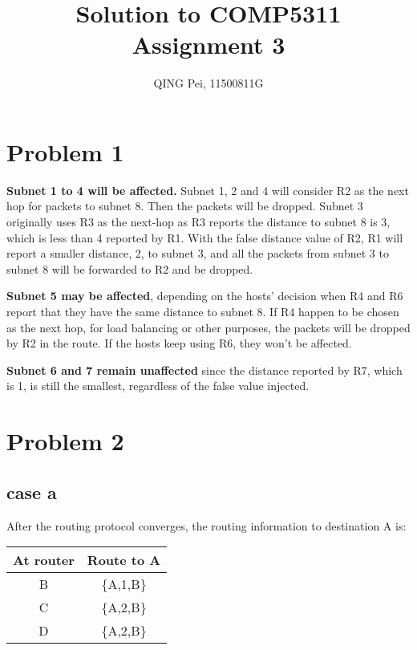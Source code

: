 \documentclass[a4paper]{article}
\title{Solution to COMP5311 Assignment 3}
\author{QING Pei, 11500811G}
\begin{document}
\maketitle

\section{Problem 1} %
\label{sec:problem_1}
\textbf{Subnet 1 to 4 will be affected.} Subnet 1, 2 and 4 will consider R2 as the next hop for packets to subnet 8. Then the packets will be dropped. Subnet 3 originally uses R3 as the next-hop as R3 reports the distance to subnet 8 is 3, which is less than 4 reported by R1. With the false distance value of R2, R1 will report a smaller distance, 2, to subnet 3, and all the packets from subnet 3 to subnet 8 will be forwarded to R2 and be dropped.

\textbf{Subnet 5 may be affected}, depending on the hosts' decision when R4 and R6 report that they have the same distance to subnet 8. If R4 happen to be chosen as the next hop, for load balancing or other purposes, the packets will be dropped by R2 in the route. If the hosts keep using R6, they won't be affected.

\textbf{Subnet 6 and 7 remain unaffected} since the distance reported by R7, which is 1, is still the smallest, regardless of the false value injected.


\section{Problem 2} %
\label{sec:problem_2}
\subsection{case a} %
\label{sub:case_a}
After the routing protocol converges, the routing information to destination A is:

\begin{center}
\begin{tabular}{cc}
\hline
At router & Route to A\\
\hline
        B &  \{A,1,B\}\\
        C &  \{A,2,B\}\\
        D &  \{A,2,B\}\\
\hline
\end{tabular}
\end{center}
\end{document}
